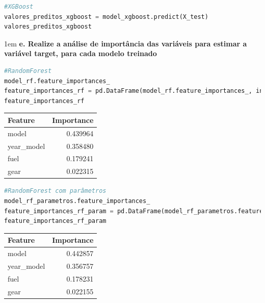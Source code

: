 \begin{lstlisting}[language=Python, style=input]
#XGBoost
valores_preditos_xgboost = model_xgboost.predict(X_test)
valores_preditos_xgboost
\end{lstlisting}

\begin{adjustwidth}{1em}{}
\textbf{e. Realize a análise de importância das variáveis para estimar a variável target, \textbf{para cada modelo treinado}}
\end{adjustwidth}
\begin{lstlisting}[language=Python, style=input]
#RandomForest
model_rf.feature_importances_
feature_importances_rf = pd.DataFrame(model_rf.feature_importances_, index = X_train.columns, columns=['importance']).sort_values('importance', ascending = False)
feature_importances_rf 
\end{lstlisting}
\begin{table}[H]
\centering
\begin{tcolorbox}[myoutputstyle]
\begin{tabular}{lr}
\hline
\textbf{Feature} & \textbf{Importance} \\
\hline
model      & 0.439964 \\
year\_model & 0.358480 \\
fuel       & 0.179241 \\
gear       & 0.022315 \\
\hline
\end{tabular}
\end{tcolorbox}
\end{table}


\begin{lstlisting}[language=Python, style=input]
#RandomForest com parâmetros
model_rf_parametros.feature_importances_
feature_importances_rf_param = pd.DataFrame(model_rf_parametros.feature_importances_, index = X_train.columns, columns=['importance']).sort_values('importance', ascending = False)
feature_importances_rf_param
\end{lstlisting}
\begin{table}[H]
\centering
\begin{tcolorbox}[myoutputstyle]
\begin{tabular}{lr}
\hline
\textbf{Feature} & \textbf{Importance} \\
\hline
model       & 0.442857 \\
year\_model & 0.356757 \\
fuel        & 0.178231 \\
gear        & 0.022155 \\
\hline
\end{tabular}
\end{tcolorbox}
\end{table}


